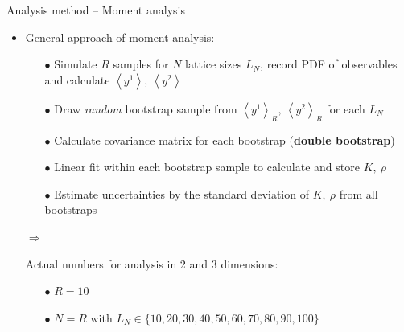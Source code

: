 \documentclass[xcolor=dvipsnames]{beamer}
\newcommand{\myitemsep}{\setlength\itemsep{0.33cm}}
\newcommand{\mysubitemsep}{\setlength\itemsep{0.22cm}}
\begin{document}
    \begin{frame}{Analysis method -- Moment analysis}
        \begin{itemize}
            \myitemsep
            \item {General approach of moment analysis:
                \begin{itemize}
                    \mysubitemsep
                    \item[$\bullet$] Simulate $R$ samples for $N$ lattice sizes $L_N$, record PDF of observables and
                                     calculate $\left\langle y^1 \right\rangle,\ \left\langle y^2 \right\rangle$
                    \item[$\bullet$] Draw \textit{random} bootstrap sample from $\left\langle y^1 \right\rangle_R,
                                     \ \left\langle y^2 \right\rangle_R$ for each $L_N$
                    \item[$\bullet$] Calculate covariance matrix for each bootstrap (\textbf{double bootstrap})
                    \item[$\bullet$] Linear fit within each bootstrap sample to calculate and store $K,\ \rho$
                    \item[$\bullet$] Estimate uncertainties by the standard deviation of $K,\ \rho$ from all bootstraps
                \end{itemize}
            }
            \item[$\Rightarrow$] {Actual numbers for analysis in 2 and 3 dimensions:
                \begin{itemize}
                    \mysubitemsep
                    \item[$\bullet$] $R = 10$
                    \item[$\bullet$] $N = R$ with $L_N \in \{10, 20, 30, 40, 50, 60, 70, 80, 90, 100\}$
                \end{itemize}
            }
        \end{itemize}
    \end{frame}
    
\end{document}
